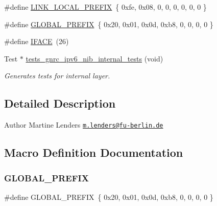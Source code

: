 \begin{DoxyCompactItemize}
\item 
\#define \hyperlink{tests-gnrc__ipv6__nib-internal_8c_afdde2b5e188f40733367a828c6cff8db}{L\+I\+N\+K\+\_\+\+L\+O\+C\+A\+L\+\_\+\+P\+R\+E\+F\+IX}~\{ 0xfe, 0x08, 0, 0, 0, 0, 0, 0 \}
\item 
\#define \hyperlink{tests-gnrc__ipv6__nib-internal_8c_a3547c5d8dd0ec47980befe1e468aeecf}{G\+L\+O\+B\+A\+L\+\_\+\+P\+R\+E\+F\+IX}~\{ 0x20, 0x01, 0x0d, 0xb8, 0, 0, 0, 0 \}
\item 
\#define \hyperlink{tests-gnrc__ipv6__nib-internal_8c_abe3b3d3d603a3dfe59b01af630406510}{I\+F\+A\+CE}~(26)
\item 
Test $\ast$ \hyperlink{group__unittests_gabe2d41bf28233304c4a66a8ac44c9404}{tests\+\_\+gnrc\+\_\+ipv6\+\_\+nib\+\_\+internal\+\_\+tests} (void)
\begin{DoxyCompactList}\small\item\em Generates tests for internal layer. \end{DoxyCompactList}\end{DoxyCompactItemize}


\subsection{Detailed Description}
\begin{DoxyAuthor}{Author}
Martine Lenders \href{mailto:m.lenders@fu-berlin.de}{\tt m.\+lenders@fu-\/berlin.\+de} 
\end{DoxyAuthor}


\subsection{Macro Definition Documentation}
\mbox{\label{tests-gnrc__ipv6__nib-internal_8c_a3547c5d8dd0ec47980befe1e468aeecf}} 
\subsubsection{\texorpdfstring{G\+L\+O\+B\+A\+L\+\_\+\+P\+R\+E\+F\+IX}{GLOBAL\_PREFIX}}
{\footnotesize\ttfamily \#define G\+L\+O\+B\+A\+L\+\_\+\+P\+R\+E\+F\+IX~\{ 0x20, 0x01, 0x0d, 0xb8, 0, 0, 0, 0 \}}

